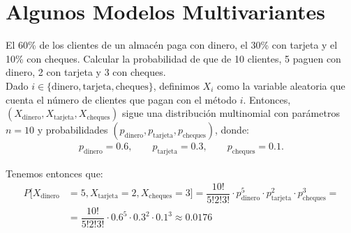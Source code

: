 \section{Algunos Modelos Multivariantes}

\begin{ejercicio}
    El 60\% de los clientes de un almacén paga con dinero, el 30\% con tarjeta y el 10\% con cheques. Calcular la probabilidad de que de 10 clientes, 5 paguen con dinero, 2 con tarjeta y 3 con cheques.\\

    Dado $i\in \{\text{dinero},\text{tarjeta},\text{cheques}\}$, definimos $X_i$ como la variable aleatoria que cuenta el número de clientes que pagan con el método $i$. Entonces, $(X_{\text{dinero}},X_{\text{tarjeta}},X_{\text{cheques}})$ sigue una distribución multinomial con parámetros $n = 10$ y probabilidades $(p_{\text{dinero}},p_{\text{tarjeta}},p_{\text{cheques}})$, donde:
    \begin{gather*}
        p_{\text{dinero}} = 0.6,\qquad 
        p_{\text{tarjeta}} = 0.3,\qquad
        p_{\text{cheques}} = 0.1.
    \end{gather*}

    Tenemos entonces que:
    \begin{align*}
        P[X_{\text{dinero}} &= 5,X_{\text{tarjeta}} = 2,X_{\text{cheques}} = 3] = \dfrac{10!}{5!2!3!}\cdot p_{\text{dinero}}^5 \cdot p_{\text{tarjeta}}^2 \cdot p_{\text{cheques}}^3
        =\\&= \dfrac{10!}{5!2!3!} \cdot 0.6^5 \cdot 0.3^2 \cdot 0.1^3
        \approx 0.0176
    \end{align*}
\end{ejercicio}


